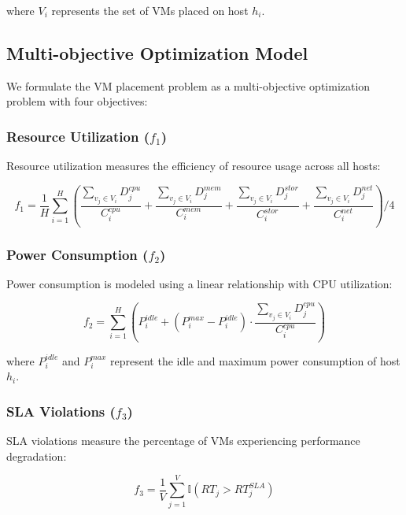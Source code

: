 \documentclass[conference]{IEEEtran}
\begin{document}
where $V_i$ represents the set of VMs placed on host $h_i$.

\subsection{Multi-objective Optimization Model}

We formulate the VM placement problem as a multi-objective optimization problem with four objectives:

\subsubsection{Resource Utilization ($f_1$)}

Resource utilization measures the efficiency of resource usage across all hosts:

\begin{equation}
f_1 = \frac{1}{H} \sum_{i=1}^{H} \left( \frac{\sum_{v_j \in V_i} D_j^{cpu}}{C_i^{cpu}} + \frac{\sum_{v_j \in V_i} D_j^{mem}}{C_i^{mem}} + \frac{\sum_{v_j \in V_i} D_j^{stor}}{C_i^{stor}} + \frac{\sum_{v_j \in V_i} D_j^{net}}{C_i^{net}} \right) / 4
\end{equation}

\subsubsection{Power Consumption ($f_2$)}

Power consumption is modeled using a linear relationship with CPU utilization:

\begin{equation}
f_2 = \sum_{i=1}^{H} \left( P_i^{idle} + (P_i^{max} - P_i^{idle}) \cdot \frac{\sum_{v_j \in V_i} D_j^{cpu}}{C_i^{cpu}} \right)
\end{equation}

where $P_i^{idle}$ and $P_i^{max}$ represent the idle and maximum power consumption of host $h_i$.

\subsubsection{SLA Violations ($f_3$)}

SLA violations measure the percentage of VMs experiencing performance degradation:

\begin{equation}
f_3 = \frac{1}{V} \sum_{j=1}^{V} \mathbb{I}(RT_j > RT_j^{SLA})
\end{equation}
\end{document}
